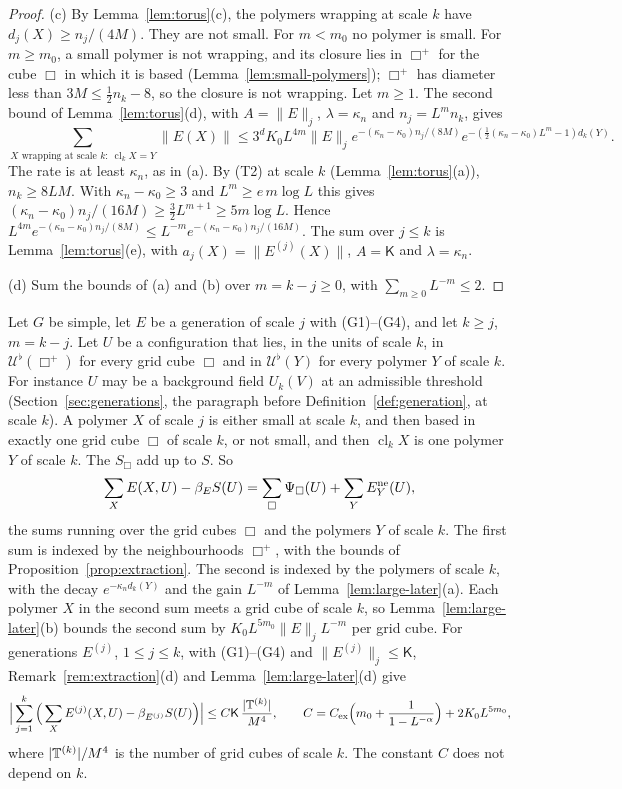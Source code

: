 \begin{proof}
(c) By Lemma~\ref{lem:torus}(c), the polymers wrapping at scale $k$ have $d_j(X)\ge n_j/(4M)$. They are not small. For $m<m_0$ no polymer is small. For $m\ge m_0$, a small polymer is not wrapping, and its closure lies in $\Box^+$ for the cube $\Box$ in which it is based (Lemma~\ref{lem:small-polymers}); $\Box^+$ has diameter less than $3M\le\frac12n_k-8$, so the closure is not wrapping. Let $m\ge1$. The second bound of Lemma~\ref{lem:torus}(d), with $A=\|E\|_j$, $\lambda=\kappa_n$ and $n_j=L^mn_k$, gives
\[
\sum_{X\text{ wrapping at scale }k:\ \operatorname{cl}_kX=Y}\|E(X)\|\le3^dK_0L^{4m}\|E\|_je^{-(\kappa_n-\kappa_0)n_j/(8M)}e^{-(\frac12(\kappa_n-\kappa_0)L^m-1)d_k(Y)} .
\]
The rate is at least $\kappa_n$, as in (a). By (T2) at scale $k$ (Lemma~\ref{lem:torus}(a)), $n_k\ge8LM$. With $\kappa_n-\kappa_0\ge3$ and $L^m\ge e\,m\log L$ this gives $(\kappa_n-\kappa_0)n_j/(16M)\ge\frac32L^{m+1}\ge5m\log L$. Hence $L^{4m}e^{-(\kappa_n-\kappa_0)n_j/(8M)}\le L^{-m}e^{-(\kappa_n-\kappa_0)n_j/(16M)}$. The sum over $j\le k$ is Lemma~\ref{lem:torus}(e), with $a_j(X)=\|E^{(j)}(X)\|$, $A=\mathsf K$ and $\lambda=\kappa_n$.

(d) Sum the bounds of (a) and (b) over $m=k-j\ge0$, with $\sum_{m\ge0}L^{-m}\le2$.
\end{proof}

\begin{remark}\label{rem:old-later}
Let $G$ be simple, let $E$ be a generation of scale $j$ with (G1)--(G4), and let $k\ge j$, $m=k-j$. Let $U$ be a configuration that lies, in the units of scale $k$, in $\mathcal U^\flat(\Box^+)$ for every grid cube $\Box$ and in $\mathcal U^\flat(Y)$ for every polymer $Y$ of scale $k$. For instance $U$ may be a background field $U_k(V)$ at an admissible threshold (Section~\ref{sec:generations}, the paragraph before Definition~\ref{def:generation}, at scale $k$). A polymer $X$ of scale $j$ is either small at scale $k$, and then based in exactly one grid cube $\Box$ of scale $k$, or not small, and then $\operatorname{cl}_kX$ is one polymer $Y$ of scale $k$. The $S_\Box$ add up to $S$. So
\[
\sum_XE(X,U)-\beta_ES(U)=\sum_\Box\Psi_\Box(U)+\sum_YE^{\rm ne}_Y(U),
\]
the sums running over the grid cubes $\Box$ and the polymers $Y$ of scale $k$. The first sum is indexed by the neighbourhoods $\Box^+$, with the bounds of Proposition~\ref{prop:extraction}. The second is indexed by the polymers of scale $k$, with the decay $e^{-\kappa_nd_k(Y)}$ and the gain $L^{-m}$ of Lemma~\ref{lem:large-later}(a). Each polymer $X$ in the second sum meets a grid cube of scale $k$, so Lemma~\ref{lem:large-later}(b) bounds the second sum by $K_0L^{5m_0}\|E\|_jL^{-m}$ per grid cube. For generations $E^{(j)}$, $1\le j\le k$, with (G1)--(G4) and $\|E^{(j)}\|_j\le\mathsf K$, Remark~\ref{rem:extraction}(d) and Lemma~\ref{lem:large-later}(d) give
\[
\Big|\sum_{j=1}^k\Big(\sum_XE^{(j)}(X,U)-\beta_{E^{(j)}}S(U)\Big)\Big|\le C\mathsf K\,\frac{|\mathbb T^{(k)}|}{M^4},\qquad C=C_{\rm ex}\Big(m_0+\frac1{1-L^{-\alpha}}\Big)+2K_0L^{5m_0},
\]
where $|\mathbb T^{(k)}|/M^4$ is the number of grid cubes of scale $k$. The constant $C$ does not depend on $k$.
\end{remark}
